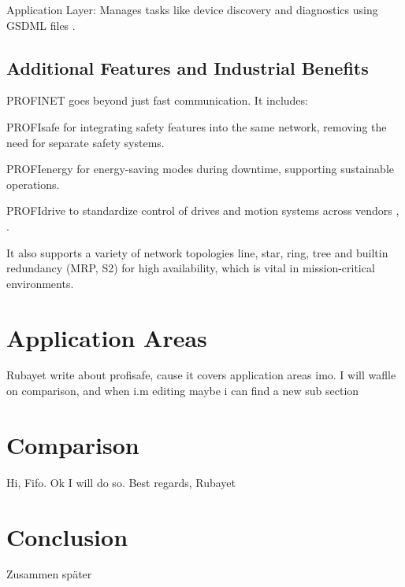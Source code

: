 \documentclass[conference]{IEEEtran}
\begin{document}
Application Layer: Manages tasks like device discovery and diagnostics using GSDML files \cite{patzke1998fieldbus}.

\subsection{Additional Features and Industrial Benefits}
PROFINET goes beyond just fast communication. It includes:

PROFIsafe for integrating safety features into the same network, removing the need for separate safety systems.

PROFIenergy for energy-saving modes during downtime, supporting sustainable operations.

PROFIdrive to standardize control of drives and motion systems across vendors \cite{galloway2012industrial}, \cite{jasperneite2007limits}.

It also supports a variety of network topologies line, star, ring, tree and builtin redundancy (MRP, S2) for high availability, which is vital in mission-critical environments.

\section{Application Areas}
Rubayet write about profisafe, cause it covers application areas imo. I will waflle on comparison, and when i.m editing maybe i can find a new sub section
\section{Comparison}
Hi, Fifo. Ok I will do so. Best regards, Rubayet
\section{Conclusion}

Zusammen später

\printbibliography
\end{document}
